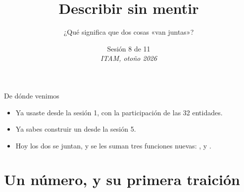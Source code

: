 %



\title[Lab de R · Sesión 8]{Describir sin mentir}
\subtitle{¿Qué significa que dos cosas «van juntas»?}
\date{%
  Sesión 8 de 11\\[0.3em]
  \textit{ITAM, otoño 2026}%
}



{
\begin{frame}
  \titlepage
\end{frame}}


\begin{frame}{De dónde venimos}
  \vspace{0.3em}
  \begin{itemize}\setlength{\itemsep}{0.9em}
    \item<1-> Ya usaste  desde la sesión 1, con la
          participación de las 32 entidades.
    \item<2-> Ya sabes construir un  desde la sesión 5.
    \item<3-> Hoy los dos se juntan, y se les suman tres funciones nuevas:
          ,  y .
  \end{itemize}
\end{frame}

\section{Un número, y su primera traición}

